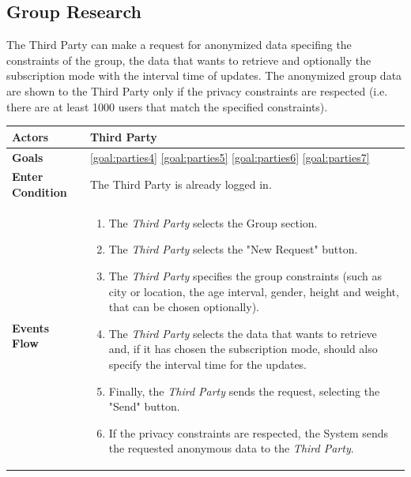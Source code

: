 \newpage
\subsection{Group Research}
The Third Party can make a request for anonymized data specifing the constraints of the group, the data that wants to retrieve and optionally the subscription mode with the interval time of updates. The anonymized group data are shown to the Third Party only if the privacy constraints are respected (i.e. there are at least 1000 users that match the specified constraints).

\begin{table}[H]
	\centering
    
    \begin{tabular}{|p{3.5cm}|p{10.3cm}|}
    
    \hline
    \textbf{\large{Actors}}  			& \tabitem Third Party 																\\
    \hline
    \textbf{\large{Goals}} 				& \ref{goal:parties4}                                                         \ref{goal:parties5}                                    \ref{goal:parties6} \ref{goal:parties7}\\
    
    \hline
    
    \textbf{\large{Enter Condition}}	& The Third Party is already logged in. \\
    
    \hline
    
    \textbf{\large{Events Flow}}		& \begin{enumerate}[leftmargin=0.5cm]
                                \item The \emph{Third Party} selects the Group section.
                                \item The \emph{Third Party} selects the "New Request" button.
                                \item The \emph{Third Party} specifies the group constraints (such as city or location, the age interval, gender, height and weight, that can be chosen optionally).
                                 \item The \emph{Third Party} selects the data that wants to retrieve and, if it has chosen the subscription mode, should also specify the interval time for the updates.
                                 \item Finally, the \emph{Third Party} sends the request, selecting the "Send" button.
                                 \item If the privacy constraints are respected, the System sends the requested anonymous data to the \emph{Third Party}.
                                           

\end{enumerate}
\end{tabular}
\end{table}

